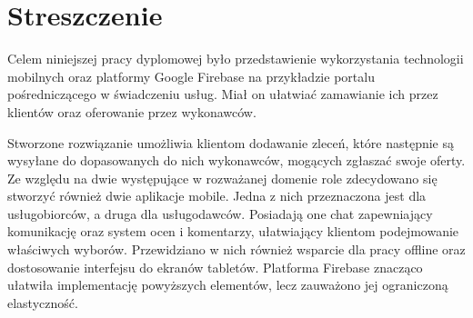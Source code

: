 \section*{Streszczenie}
\vspace{1cm}

Celem niniejszej pracy dyplomowej było przedstawienie wykorzystania technologii mobilnych oraz platformy Google Firebase na przykładzie portalu pośredniczącego w świadczeniu usług. Miał on ułatwiać zamawianie ich przez klientów oraz oferowanie przez wykonawców.

Stworzone rozwiązanie umożliwia klientom dodawanie zleceń, które następnie są wysyłane do dopasowanych do nich wykonawców, mogących zgłaszać swoje oferty. Ze względu na dwie występujące w rozważanej domenie role zdecydowano się stworzyć również dwie aplikacje mobile. Jedna z nich przeznaczona jest dla usługobiorców, a druga dla usługodawców. Posiadają one chat zapewniający komunikację oraz system ocen i komentarzy, ułatwiający klientom podejmowanie właściwych wyborów. Przewidziano w nich również wsparcie dla pracy offline oraz dostosowanie interfejsu do ekranów tabletów. Platforma Firebase znacząco ułatwiła implementację powyższych elementów, lecz zauważono jej ograniczoną elastyczność.





